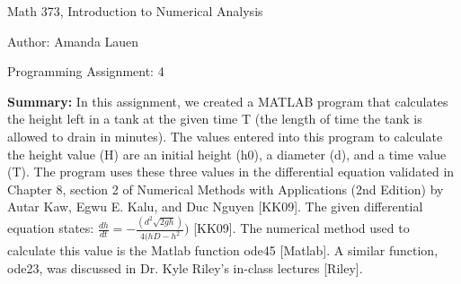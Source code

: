 \documentclass{article}
\begin{document}

\large

{\Large Math 373, Introduction to Numerical Analysis}

\begin{center}
{\Large Author: \hfill Amanda Lauen} %
\end{center}
\par \medskip \par
{\Large Programming Assignment: 4} 
\par \bigskip \par

{\bf Summary:} {\color{black} In this assignment, we created a MATLAB program that calculates the height left in a tank at the given time T (the length of time the tank is allowed to drain in minutes).  The values entered into this program to calculate the height value (H) are an initial height (h0), a diameter (d), and a time value (T).  The program uses these three values in the differential equation validated in Chapter 8, section 2 of Numerical Methods with Applications (2nd Edition) by Autar Kaw, Egwu E. Kalu, and Duc Nguyen [KK09].  The given differential equation states: $\frac{dh}{dt}=-\frac{(d^2\sqrt{2gh})}{4(hD-h^2})$ [KK09].  The numerical method used to calculate this value is the Matlab function ode45 [Matlab].  A similar function, ode23, was discussed in Dr. Kyle Riley’s in-class lectures [Riley].} 
\par \bigskip \par
\end{document}
